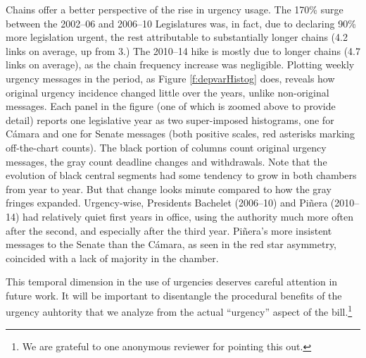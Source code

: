 \documentclass[letter,12pt]{article}
\begin{document}
Chains offer a better perspective of the rise in urgency usage. The 170\% surge between the 2002--06 and 2006--10 Legislatures was, in fact, due to declaring 90\% more legislation urgent, the rest attributable to substantially longer chains (4.2 links on average, up from 3.) The 2010--14 hike is mostly due to longer chains (4.7 links on average), as the chain frequency increase was negligible. Plotting weekly urgency messages in the period, as Figure \ref{f:depvarHistog} does, reveals how original urgency incidence changed little over the years, unlike non-original messages. Each panel in the figure (one of which is zoomed above to provide detail) reports one legislative year as two super-imposed histograms, one for C\'amara and one for Senate messages (both positive scales, red asterisks marking off-the-chart counts). The black portion of columns count original urgency messages, the gray count deadline changes and withdrawals. Note that the evolution of black central segments had some tendency to grow in both chambers from year to year. But that change looks minute compared to how the gray fringes expanded. Urgency-wise, Presidents Bachelet (2006--10) and Pi\~nera (2010--14) had relatively quiet first years in office, using the authority much more often after the second, and especially after the third year. Pi\~nera's more insistent messages to the Senate than the C\'amara, as seen in the red star asymmetry, coincided with a lack of majority in the chamber. 

This temporal dimension in the use of urgencies deserves careful attention in future work. It will be important to disentangle the procedural benefits of the urgency auhtority that we analyze from the actual ``urgency'' aspect of the bill.\footnote{We are grateful to one anonymous reviewer for pointing this out.}

\end{document}
